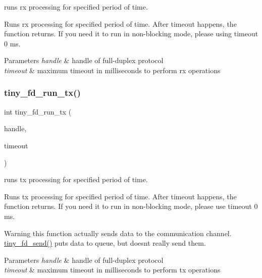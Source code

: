 runs rx processing for specified period of time. 

Runs rx processing for specified period of time. After timeout happens, the function returns. If you need it to run in non-\/blocking mode, please using timeout 0 ms.


\begin{DoxyParams}{Parameters}
{\em handle} & handle of full-\/duplex protocol \\
\hline
{\em timeout} & maximum timeout in milliseconds to perform rx operations \\
\hline
\end{DoxyParams}
\mbox{\label{group__FULL__DUPLEX__API_ga601c9874a570331580856c1ea28f7914}} 
\subsubsection{\texorpdfstring{tiny\+\_\+fd\+\_\+run\+\_\+tx()}{tiny\_fd\_run\_tx()}}
{\footnotesize\ttfamily int tiny\+\_\+fd\+\_\+run\+\_\+tx (\begin{DoxyParamCaption}\item[{\hyperlink{group__FULL__DUPLEX__API_ga91e6b79431fe38570fb102701ef0b7e8}{tiny\+\_\+fd\+\_\+handle\+\_\+t}}]{handle,  }\item[{uint16\+\_\+t}]{timeout }\end{DoxyParamCaption})}



runs tx processing for specified period of time. 

Runs tx processing for specified period of time. After timeout happens, the function returns. If you need it to run in non-\/blocking mode, please use timeout 0 ms.

\begin{DoxyWarning}{Warning}
this function actually sends data to the communication channel. \hyperlink{group__FULL__DUPLEX__API_ga490157ee98ea6148f99a5bb1f26c5f60}{tiny\+\_\+fd\+\_\+send()} puts data to queue, but doesn\textquotesingle{}t really send them.
\end{DoxyWarning}

\begin{DoxyParams}{Parameters}
{\em handle} & handle of full-\/duplex protocol \\
\hline
{\em timeout} & maximum timeout in milliseconds to perform tx operations \\
\hline
\end{DoxyParams}
\mbox{\label{group__FULL__DUPLEX__API_ga490157ee98ea6148f99a5bb1f26c5f60}} 
